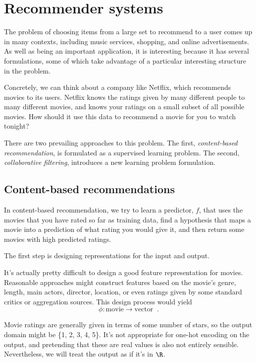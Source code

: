 \chapter{Recommender systems}
The problem of choosing items from a large set to recommend to a user
comes up in many contexts, including  music services, shopping, and online
advertisements.  As well as being an important application, it is
interesting because it has several formulations, some of which take
advantage of a particular interesting structure in the problem.

Concretely, we can think about a company like Netflix, which
recommends movies to its users.  Netflix knows the ratings given by
many different people to many different movies, and knows your ratings on a
small subset of all possible movies. How should it use this data to
recommend a movie for you to watch tonight?

There are two prevailing approaches to this problem.  The first,
{\em content-based recommendation}, is formulated as a supervised learning
problem.  The second, {\em collaborative filtering}, introduces a new
learning problem formulation.

\section{Content-based recommendations}
In content-based recommendation, we try to learn a predictor, $f$,
that uses the movies that you have rated so far as training data,
find a hypothesis that maps a movie into a prediction of what rating
you would give it, and then return some movies with high predicted
ratings.

The first step is designing representations for the input and output.

It's actually pretty difficult to design a good feature representation
for movies.   Reasonable approaches might construct features based on
the movie's genre, length,  main actors, director, location, or even
ratings given by some standard critics or aggregation sources.  This
design process would yield
\[\phi : \text{movie} \rightarrow \text{vector}\;\;.\]

Movie ratings are generally given in terms of some number of stars,
so the output domain might be \{1, 2, 3, 4, 5\}.  It's not
appropriate for one-hot encoding on the output, and pretending that
these are real values is also not entirely sensible.  Nevertheless, we
will treat the output as if it's in $\R$.

